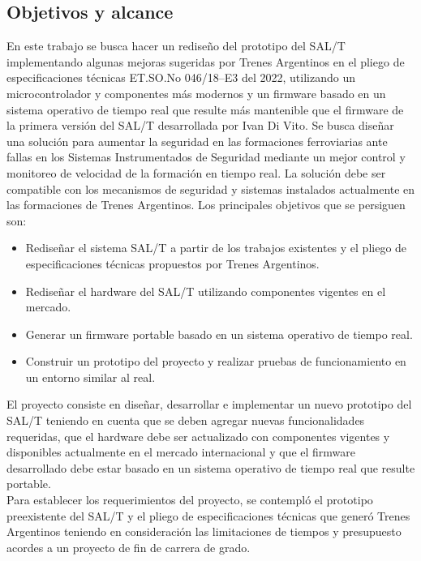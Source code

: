 \subsection{Objetivos y alcance}

En este trabajo se busca hacer un rediseño del prototipo del SAL/T implementando algunas mejoras sugeridas por Trenes Argentinos en el pliego de especificaciones técnicas ET.SO.No 046/18–E3 \cite{spec} del 2022, utilizando un microcontrolador y componentes más modernos y un firmware basado en un sistema operativo de tiempo real que resulte más mantenible que el firmware de la primera versión del SAL/T desarrollada por Ivan Di Vito. Se busca diseñar una solución para aumentar la seguridad en las formaciones ferroviarias ante fallas en los Sistemas Instrumentados de Seguridad mediante un mejor control y monitoreo de velocidad de la formación en tiempo real. La solución debe ser compatible con los mecanismos de seguridad y sistemas instalados actualmente en las formaciones de Trenes Argentinos. Los principales objetivos que se persiguen son:


\begin{itemize}
    \item Rediseñar el sistema SAL/T a partir de los trabajos existentes y el pliego de especificaciones técnicas propuestos por Trenes Argentinos.
    \item Rediseñar el hardware del SAL/T utilizando componentes vigentes en el mercado.
    \item Generar un firmware portable basado en un sistema operativo de tiempo real.
    \item Construir un prototipo del proyecto y realizar pruebas de funcionamiento en un entorno similar al real.
\end{itemize}


El proyecto consiste en diseñar, desarrollar e implementar un nuevo prototipo del SAL/T teniendo en cuenta que se deben agregar nuevas funcionalidades requeridas, que el hardware debe ser actualizado con componentes vigentes y disponibles actualmente en el mercado internacional y que el firmware desarrollado debe estar basado en un sistema operativo de tiempo real que resulte portable. \\

Para establecer los requerimientos del proyecto, se contempló el prototipo preexistente del SAL/T y el pliego de especificaciones técnicas que generó Trenes Argentinos \cite{spec} teniendo en consideración las limitaciones de tiempos y presupuesto acordes a un proyecto de fin de carrera de grado. \\

